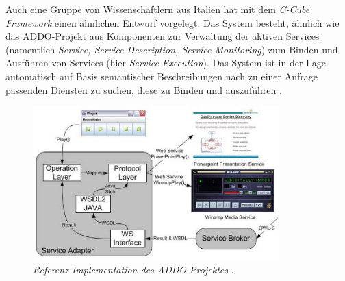 Auch eine Gruppe von Wissenschaftlern aus Italien hat mit dem \emph{C-Cube Framework} \cite{ccube} einen ähnlichen Entwurf vorgelegt. Das System besteht, ähnlich wie das \ac{ADDO}-Projekt aus Komponenten zur Verwaltung der aktiven Services (namentlich \emph{Service, Service Description, Service Monitoring}) zum Binden und Ausführen von Services (hier \emph{Service Execution}). Das System ist in der Lage automatisch auf Basis semantischer Beschreibungen nach zu einer Anfrage passenden Diensten zu suchen, diese zu Binden und auszuführen \cite[S.4]{ccube}.

\begin{figure}[ht]
\centering
\parbox{0.85\textwidth}{
    \includegraphics[width=0.85\textwidth]{media/addo-player-example.png}
    \caption{\emph{Referenz-Implementation des \ac{ADDO}-Projektes} \cite[S.418]{flexbrok}.}
    \label{f:addo-player}
}
\end{figure}

